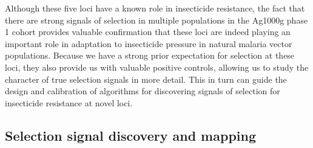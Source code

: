 \documentclass[a4paper,11pt,abstracton,hidelinks]{scrartcl}
\begin{document}
Although these five loci have a known role in insecticide resistance, the fact that there are strong signals of selection in multiple populations in the Ag1000g phase 1 cohort provides valuable confirmation that these loci are indeed playing an important role in adaptation to insecticide pressure in natural malaria vector populations.
%
Because we have a strong prior expectation for selection at these loci, they also provide us with valuable positive controls, allowing us to study the character of true selection signals in more detail.
%
This in turn can guide the design and calibration of algorithms for discovering signals of selection for insecticide resistance at novel loci.


\subsection{Selection signal discovery and mapping}\label{subsec:signal-discovery}
\end{document}
